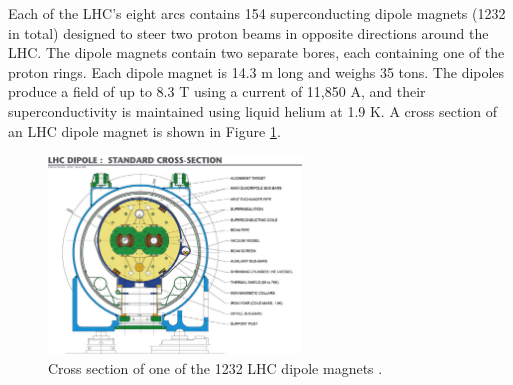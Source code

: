 Each of the LHC's eight arcs contains 154 superconducting dipole magnets (1232 in total) 
designed to steer two proton beams in opposite directions around the LHC.
The dipole magnets contain two separate bores, each containing one of the proton
rings.  Each dipole magnet is 14.3 m long and weighs 35 tons.
The dipoles produce a field of up to 8.3 T using a current of 11,850 A, and
their superconductivity is maintained using liquid helium at 1.9 K. 
A cross section of an LHC dipole magnet is shown in Figure \ref{fig:lhc-dipole}.
\begin{figure}
  \centering
  \includegraphics[width=0.6\textwidth]{tex/lhc/fig/lhc-dipole.jpg}
  \caption{Cross section of one of the 1232 LHC dipole magnets \cite{lhc-jinst}.}
  \label{fig:lhc-dipole}
\end{figure}

